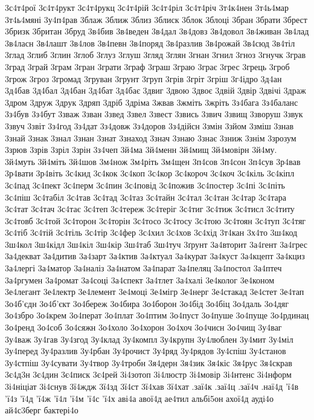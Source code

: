 {3с4т4рої
3с4т4рукт
3с4т4рукц
3с4т4рій
3с4т4ріл
3с4т4річ
3т4к4нен
3т4ь4мар
3т4ь4мяні
3у4п4рав
3блаж
3ближ
3близ
3блиск
3блок
3блоці
3бран
3брати
3брест
3бризк
3британ
3бруд
3в4бив
3в4веден
3в4дал
3в4довз
3в4довол
3в4живан
3в4лад
3в4ласн
3в4лашт
3в4лов   
3в4певн
3в4поряд
3в4разлив
3в4рожай
3в4сюд
3в4тіл
3глад
3глиб
3глин
3глоб
3глуз
3глуш
3гляд
3глян
3гнан
3гнил
3гноз
3гнучк
3грав
3град
3грай
3грам
3гран
3грати
3граф
3граш
3граю
3грає
3грес
3грець
3гроб
3грож
3гроз
3громад
3груван
3грунт
3груп
3грів
3гріт
3гріш
3г4ідро
3д4ан
3д4бав
3д4бал
3д4бан
3д4бат
3д4бає
3двиг
3двою
3двоє
3двій
3двір
3двічі
3драж
3дром
3друж
3друк
3дряп
3дріб
3дріма
3жвав
3жміть
3жріть
3з4бага
3з4баланс
3з4був
3з4бут
3зваж
3зван
3звед
3звел
3звест
3звись 
3звич
3звищ
3зворуш
3звук
3звуч
3звіт     
3з4год     
3з4дат
3з4довж
3з4доров
3з4дійсн
3змін
3зйом
3зміш
3знав
3знай
3знак
3знал
3знан
3знат
3знаход
3знач
3знаю
3знає
3зниж
3знім
3зрозум
3зрюв 
3зрів 
3зріл 
3зрін 
3з4чеп
3й4ма
3й4менн
3й4мищ
3й4мовірн
3й4му.
3й4муть
3й4міть
3й4шов
3м4нож
3м4ріть
3м4щен
3п4сов
3п4сон
3п4сув
3р4вав
3р4вати
3р4віть
3с4кид
3с4кок
3с4коп     
3с4кор
3с4короч
3с4коч     
3с4кіль
3с4кіпл
3с4пад
3с4пект
3с4перм
3с4пин
3с4повід
3с4пожив
3с4постер
3с4пі
3с4піть
3с4піш
3с4табіл 
3с4тав 
3с4тад 
3с4таз
3с4тайн
3с4тал
3с4тан
3с4тар
3с4тара
3с4тат
3с4тач
3с4тає
3с4теп     
3с4тереж
3с4теріг
3с4тиг
3с4тиж
3с4тисл
3с4титу
3с4товб 
3с4той
3с4торон
3с4торін
3с4тосо
3с4тосу
3с4тою
3с4тоян 
3с4туп
3с4тяг
3с4тіб
3с4тій
3с4тіль
3с4тір
3с4фер
3с4хил
3с4хов
3с4хід
3т4кан
3х4то
3ш4код
3ш4кол
3ш4кідл
3ш4кіл
3ш4кір
3ш4таб
3ш4туч
3ґрунт
3а4вторит
3а4гент
3а4грес
3а4декват
3а4дитив
3а4зарт
3а4ктив
3а4ктуал
3а4курат
3а4куст
3а4кцепт
3а4кциз
3а4лергі
3а4матор
3а4наліз
3а4натом
3а4парат
3а4пеляц
3а4постол
3а4птеч
3а4ргумен
3а4ромат
3а4соці
3а4спект
3а4тлет
3а4халі
3е4колог
3е4коном
3е4легант
3е4лектр
3е4лемент
3е4моці
3е4мігр
3е4нерг
3е4стакад
3е4стет
3е4тап
3о4б'єдн
3о4б'єкт
3о4береж
3о4бира
3о4борон
3о4бід
3о4біц
3о4даль  
3о4дяг
3о4збро
3о4крем
3о4перат
3о4плат
3о4птим
3о4пуст
3о4пуше
3о4пуще
3о4рдинац
3о4ренд
3о4соб
3о4сяжн
3о4холо
3о4хорон
3о4хоч
3о4чисн
3о4чищ
3у4ваг
3у4важ
3у4гав
3у4згод
3у4клад
3у4компл
3у4крупн
3у4люблен
3у4мит
3у4міл
3у4перед
3у4разлив
3у4рбан
3у4рочист
3у4ряд
3у4рядов
3у4спіш
3у4станов
3у4стпіш
3у4сувати
3у4твор
3у4тробн
3я4дерн
3я4зик
3я4кіс
3я4рус
3я4скрав
3є4д3н
3є4дин
3є4писк
3є4рей
3і4зотоп
3і4люстр
3і4мовір
3і4нтенс
3і4нформ
3і4ніціат
3і4снув
3ї4ждж
3ї4зд
3ї4ст
3ї4хав
3ї4хат
.заї4к
.заї4ц
.заї4ч
.наї4д
'ї4в
'ї4з
'ї4д
'ї4ж
'ї4л
'ї4м
'ї4с
'ї4х
аві4а
авої4д
ае4тил
альбі5он
ахої4д
ауді4о
ай4с3берг
бактері4о
}
